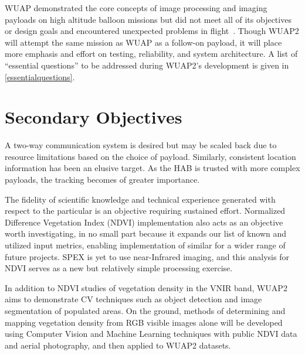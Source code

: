 \documentclass[conference]{IEEEtran} %
\begin{document}
WUAP demonstrated the core concepts of image processing and imaging payloads on high altitude balloon missions but did not meet all of its objectives or design goals and encountered unexpected problems in flight~\cite[Post-Flight Analysis]{hab4}. Though WUAP2 will attempt the same mission as WUAP as a follow-on payload, it will place more emphasis and effort on testing, reliability, and system architecture. A list of “essential questions” to be addressed during WUAP2’s development is given in \ref{essentialquestions}.


\section{Secondary Objectives}

A two-way communication system is desired but may be scaled back due to resource limitations based on the choice of payload. Similarly, consistent location information has been an elusive target. As the HAB is trusted with more complex payloads, the tracking becomes of greater importance.

The fidelity of scientific knowledge and technical experience generated with respect to the particular is an objective requiring sustained effort.
Normalized Difference Vegetation Index (NDVI) implementation also acts as an objective worth investigating, in no small part because it expands our list of known and utilized input metrics, enabling implementation of similar for a wider range of future projects. SPEX is yet to use near-Infrared imaging, and this analysis for NDVI serves as a new but relatively simple processing exercise.
 
In addition to NDVI studies of vegetation density in the VNIR band, WUAP2 aims to demonstrate CV techniques such as object detection and image segmentation of populated areas. On the ground, methods of determining and mapping vegetation density from RGB visible images alone will be developed using Computer Vision and Machine Learning techniques with public NDVI data and aerial photography, and then applied to WUAP2 datasets. 
\end{document}
